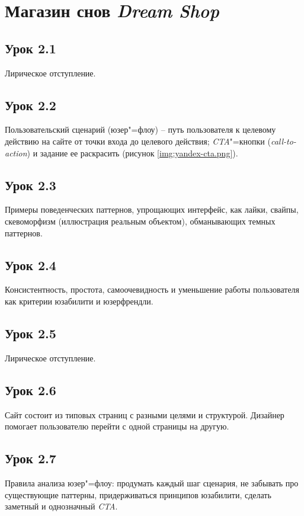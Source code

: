 \documentclass[variant=practice]{bsuir}
\begin{document}
\section{Магазин снов \textit{Dream Shop}}

\subsection{Урок 2.1} Лирическое отступление.

\subsection{Урок 2.2} Пользовательский сценарий (юзер"=флоу) -- путь
пользователя к целевому действию на сайте от точки входа до целевого действия;
\textit{CTA}"=кнопки (\textit{call-to-action}) и задание ее раскрасить (рисунок
\ref{img:yandex-cta.png}).

\subsection{Урок 2.3} Примеры поведенческих паттернов, упрощающих интерфейс, как
лайки, свайпы, скевоморфизм (иллюстрация реальным объектом), обманывающих темных
паттернов.

\subsection{Урок 2.4} Консистентность, простота, самоочевидность и уменьшение
работы пользователя как критерии юзабилити и юзерфрендли.

\subsection{Урок 2.5} Лирическое отступление.

\subsection{Урок 2.6} Сайт состоит из типовых страниц с разными целями и
структурой. Дизайнер помогает пользователю перейти с одной страницы на другую.

\subsection{Урок 2.7} Правила анализа юзер"=флоу: продумать каждый шаг сценария,
не забывать про существующие паттерны, придерживаться принципов юзабилити,
сделать заметный и однозначный \textit{CTA}.
\end{document}
